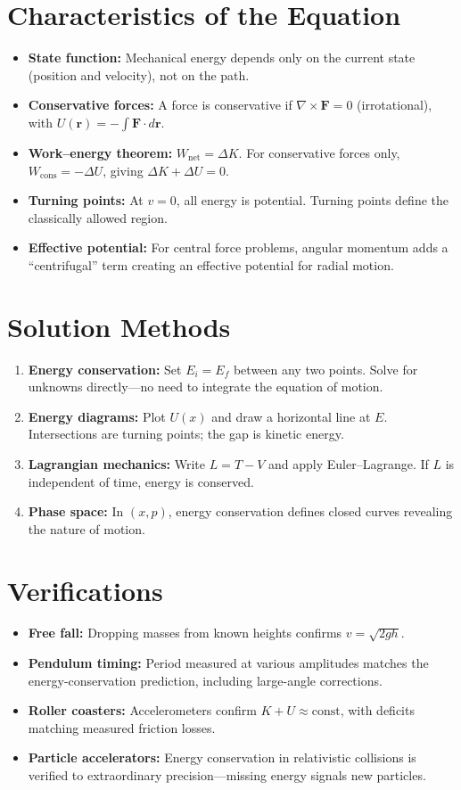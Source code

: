 \section*{Characteristics of the Equation}

\begin{itemize}
\item \textbf{State function:} Mechanical energy depends only on the current state (position and velocity), not on the path.
\item \textbf{Conservative forces:} A force is conservative if $\nabla \times \mathbf{F} = 0$ (irrotational), with $U(\mathbf{r}) = -\int \mathbf{F} \cdot d\mathbf{r}$.
\item \textbf{Work--energy theorem:} $W_{\text{net}} = \Delta K$. For conservative forces only, $W_{\text{cons}} = -\Delta U$, giving $\Delta K + \Delta U = 0$.
\item \textbf{Turning points:} At $v = 0$, all energy is potential. Turning points define the classically allowed region.
\item \textbf{Effective potential:} For central force problems, angular momentum adds a ``centrifugal'' term creating an effective potential for radial motion.
\end{itemize}
\section*{Solution Methods}

\begin{enumerate}
\item \textbf{Energy conservation:} Set $E_i = E_f$ between any two points. Solve for unknowns directly---no need to integrate the equation of motion.
\item \textbf{Energy diagrams:} Plot $U(x)$ and draw a horizontal line at $E$. Intersections are turning points; the gap is kinetic energy.
\item \textbf{Lagrangian mechanics:} Write $L = T - V$ and apply Euler--Lagrange. If $L$ is independent of time, energy is conserved.
\item \textbf{Phase space:} In $(x, p)$, energy conservation defines closed curves revealing the nature of motion.
\end{enumerate}
\section*{Verifications}

\begin{itemize}
\item \textbf{Free fall:} Dropping masses from known heights confirms $v = \sqrt{2gh}$.
\item \textbf{Pendulum timing:} Period measured at various amplitudes matches the energy-conservation prediction, including large-angle corrections.
\item \textbf{Roller coasters:} Accelerometers confirm $K + U \approx \text{const}$, with deficits matching measured friction losses.
\item \textbf{Particle accelerators:} Energy conservation in relativistic collisions is verified to extraordinary precision---missing energy signals new particles.
\end{itemize}
